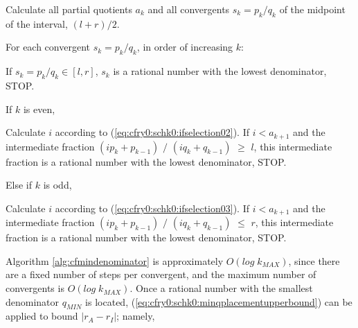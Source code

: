 \begin{vworkalgorithmstatement}\label{alg:cfmindenominator}\end{vworkalgorithmstatement}
\begin{alglvl0}
\item Calculate all partial quotients $a_k$ and all convergents
      $s_k = p_k/q_k$ of the midpoint of the interval,
      $(l+r)/2$.

\item  For each convergent $s_k=p_k/q_k$, in order of increasing $k$:

   \begin{alglvl1}

   \item If $s_k = p_k/q_k \in [l,r]$, $s_k$ is a rational number with
         the lowest denominator, STOP.

   \item If $k$ is even,

      \begin{alglvl2}

      \item Calculate $i$ according to (\ref{eq:cfry0:schk0:ifselection02}).
            If $i < a_{k+1}$ and the intermediate fraction
            $(i p_k + p_{k-1})$ $/$ $(i q_k + q_{k-1})$ $\geq$ $l$, this intermediate
            fraction is
            a rational number with the lowest denominator, STOP.

      \end{alglvl2}

   \item Else if $k$ is odd,

      \begin{alglvl2}

      \item Calculate $i$ according to (\ref{eq:cfry0:schk0:ifselection03}).
            If $i < a_{k+1}$ and the intermediate fraction
            $(i p_k + p_{k-1})$ $/$ $(i q_k + q_{k-1})$ $\leq$ $r$, this intermediate
            fraction is
            a rational number with the lowest denominator, STOP.

      \end{alglvl2}

   \end{alglvl1}

\end{alglvl0}

Algorithm \ref{alg:cfmindenominator} is approximately $O(log \; k_{MAX})$,
since there are a fixed number of steps per convergent, and the maximum number
of convergents is $O(log \; k_{MAX})$.  Once a rational number with the smallest
denominator $q_{MIN}$ is located, (\ref{eq:cfry0:schk0:minqplacementupperbound})
can be applied to bound $|r_A - r_I|$; namely,


